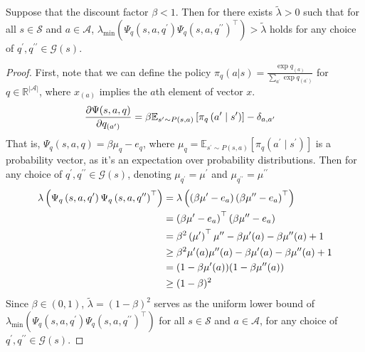 \begin{lem}\label{lem:smallestEigen} Suppose that the discount factor $\beta<1$. Then for there exists $\tilde{\lambda}>0$ such that for all $s\in\mathcal{S}$ and $a\in\mathcal{A}$, $\lambda_{\min}(\Psi_q\left(s, a, q^{\prime}\right) \Psi_q\left(s, a, q^{\prime \prime}\right)^{\top})> \tilde{\lambda}$ holds for any choice of $ q^{\prime}, q^{\prime \prime} \in \mathcal{G}(s)$.
\end{lem}
\begin{proof}
First, note that we can define the policy $\pi_q(a|s) = \frac{\exp q_{(a)}}{\sum_{a^{\prime }} \exp q_{(a^\prime)}}$ for $q\in\mathbb{R}^{|\mathcal{A}|}$, where $x_{(a)}$ implies the $a$th element of vector $x$. 
\begin{align}
     \frac{\partial \Psi(s, a, q)}{\partial q_{(a^{\prime})}}&=\beta \mathbb{E}_{s^{\prime} \sim P(s, a)}\left[\pi_q\left(a^{\prime} \mid s^{\prime}\right)\right]-\delta_{a, a^{\prime}}\notag
\end{align}
That is, $\Psi_q(s, a, q)=\beta \mu_q-e_q$, where $\mu_q=\mathbb{E}_{s^{\prime} \sim P(s, a)}\left[\pi_q\left(a^{\prime} \mid s^{\prime}\right)\right]$ is a probability vector, as it's an expectation over probability distributions. Then for any choice of $q^{\prime}, q^{\prime \prime} \in \mathcal{G}(s)$, denoting $\mu_{q^\prime} = \mu^\prime$ and $\mu_{q^{\prime\prime}} = \mu^{\prime\prime}$
\begin{align}
    \lambda\left(\Psi_q\left(s, a, q^{\prime}\right) \Psi_q\left(s, a, q^{\prime \prime}\right)^{\top}\right)& = \lambda\left(\left(\beta \mu^{\prime}-e_a\right)\left(\beta \mu^{\prime \prime}-e_a\right)^{\top}\right)\notag
    \\
    &= \left(\beta \mu^{\prime}-e_a\right)^{\top}\left(\beta \mu^{\prime \prime}-e_a\right) \notag
    \\
    &=\beta^2\left(\mu^{\prime}\right)^{\top} \mu^{\prime \prime}-\beta \mu^{\prime}(a)-\beta \mu^{\prime \prime}(a)+1 \notag
    \\
    &\ge \beta^2 \mu^{\prime}(a) \mu^{\prime \prime}(a)-\beta \mu^{\prime}(a)-\beta \mu^{\prime \prime}(a)+1 \notag
    \\
    &=(1-\beta \mu^{\prime}(a))(1-\beta \mu^{\prime\prime}(a))
    \\
    &\ge (1-\beta)^2 \notag
\end{align}
Since $\beta\in(0,1)$, $\tilde{\lambda} = (1-\beta)^2$ serves as the uniform lower bound of $\lambda_{\min}(\Psi_q\left(s, a, q^{\prime}\right) \Psi_q\left(s, a, q^{\prime \prime}\right)^{\top})$ for all $s\in\mathcal{S}$ and $a\in\mathcal{A}$, for any choice of $q^{\prime}, q^{\prime \prime} \in \mathcal{G}(s)$.
\end{proof}
